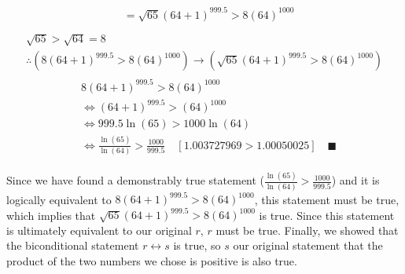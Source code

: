 \documentclass[letterpaper, 12pt]{article}
\newcommand{\qed}{\quad \blacksquare}
\newcommand{\then}{\rightarrow}
\begin{document}
\begin{enumerate}
\begin{align*}
\begin{split}
        &= \sqrt{65}(64 + 1)^{999.5} > 8(64)^{1000} \\
    \end{split}
\end{align*}
\begin{gather*}
    \sqrt{65} > \sqrt{64} = 8 \\
    \therefore (8(64 + 1)^{999.5} > 8(64)^{1000}) \then (\sqrt{65}(64 + 1)^{999.5} > 8(64)^{1000})
\end{gather*}
\begin{align*}
    \begin{split}
        & 8(64 + 1)^{999.5} > 8(64)^{1000} \\
        &\iff (64 + 1)^{999.5} > (64)^{1000} \\
        &\iff 999.5\ln(65) > 1000\ln(64) \\
        &\iff \frac{\ln(65)}{\ln(64)} > \frac{1000}{999.5} \quad [1.003727969 > 1.00050025] \qed
    \end{split}
\end{align*}
\begin{flushleft}
    Since we have found a demonstrably true statement ($\frac{\ln(65)}{\ln(64)} > \frac{1000}{999.5}$) 
    and it is logically equivalent to $8(64 + 1)^{999.5} > 8(64)^{1000}$, this statement must 
    be true, which implies that $\sqrt{65}(64 + 1)^{999.5} > 8(64)^{1000}$ is true. Since this 
    statement is ultimately equivalent to our original $r$, $r$ must be true. Finally, we showed 
    that the biconditional statement $r \leftrightarrow s$ is true, so $s$ our original 
    statement that the product of the two numbers we chose is positive is also true.
\end{flushleft}
\end{enumerate}
\end{document}
